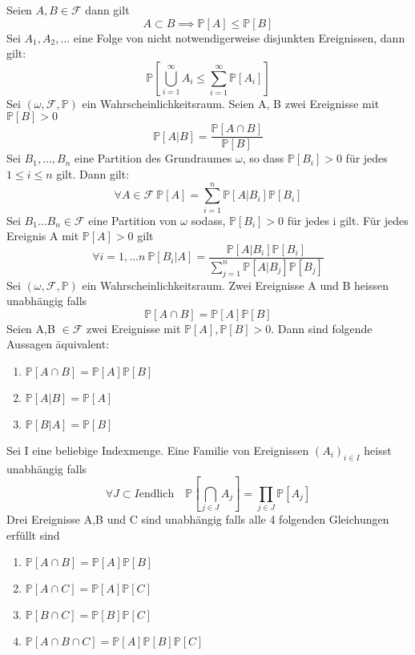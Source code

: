 \Satz[1.8] Seien \(A,B \in \mathcal{F}\) dann gilt \[ A \subset B \implies \mathbb{P}[A] \leq \mathbb{P}[B]\]
\Satz[1.9] Sei \( A_1, A_2, \dots \) eine Folge von nicht notwendigerweise disjunkten Ereignissen, dann gilt: \[ \mathbb{P}[\bigcup_{i=1}^{\infty} A_i \leq \sum_{i=1}^{\infty} \mathbb{P}[A_i]]\]
 \newline
Sei \((\omega, \mathcal{F}, \mathbb{P})\) ein Wahrscheinlichkeitsraum. Seien A, B zwei Ereignisse mit \( \mathbb{P}[B] > 0\) \[\mathbb{P}[A|B] = \frac{\mathbb{P}\left[A \cap B\right]}{\mathbb{P}\left[B\right]}\]
 \newline
Sei  \( B_1, \dots , B_n\) eine Partition des Grundraumes \( \omega \), so dass \( \mathbb{P}[B_i] > 0 \) für jedes \( 1 \leq i \leq n\) gilt. Dann gilt: \[\forall A \in  \mathcal{F} \ \mathbb{P}[A] = \sum_{i=1}^{n} \mathbb{P} \left[A | B_i \right] \mathbb{P}[B_i]\]
 \newline
Sei \( B_1 \dots B_n \in \mathcal{F }\) eine Partition von \( \omega\) sodass, \( \mathbb{P}[B_i] > 0 \) für jedes i gilt. Für jedes Ereignis A mit \( \mathbb{P}[A] > 0 \) gilt  \[ \forall i = 1, \dots n \ \mathbb{P}\left[ B_i | A \right] = \frac{\mathbb{P}[A | B_i] \mathbb{P}[B_i]}{\sum_{j=1}^{n} \mathbb{P}[A | B_j] \mathbb{P}[B_j] }\]
\Def[1.18 Unabhängigkeit] \newline
Sei \( (\omega, \mathcal{F}, \mathbb{P})\) ein Wahrscheinlichkeitsraum. Zwei Ereignisse A und B heissen unabhängig falls \[ \mathbb{P} \left[A \cap B \right] = \mathbb{P}\left[A\right] \mathbb{P} \left[B\right]\]
\Satz[1.20] \newline
Seien A,B \( \in \mathcal{F}\) zwei Ereignisse mit \( \mathbb{P}[A], \mathbb{P}[B] > 0 \). Dann sind folgende Aussagen äquivalent:
\begin{enumerate}
    \item \( \mathbb{P}[A \cap B] = \mathbb{P}[A] \mathbb{P}[B]\)
    \item \( \mathbb{P}[A | B] = \mathbb{P}[A]\)
    \item \( \mathbb{P}[B | A] = \mathbb{P}[B]\)
\end{enumerate}
\Def[1.21]  \newline
Sei I eine beliebige Indexmenge. Eine Familie von Ereignissen \( (A_i)_{i \in I}\) heisst unabhängig falls \[ \forall J \subset I \text{endlich} \quad \mathbb{P}[\bigcap_{j \in J}A_j] = \prod_{j \in J} \mathbb{P}[A_j]\]
\Bem \newline
Drei Ereignisse A,B und C sind unabhängig falls alle 4 folgenden Gleichungen erfüllt sind
\begin{enumerate}
    \item \( \mathbb{P}[A \cap B ] = \mathbb{P}[A] \mathbb{P}[B]\)
    \item \( \mathbb{P}[A \cap C ] = \mathbb{P}[A] \mathbb{P}[C]\)
    \item \( \mathbb{P}[B \cap C ] = \mathbb{P}[B] \mathbb{P}[C]\)
    \item \( \mathbb{P}[A \cap B \cap C  ] = \mathbb{P}[A] \mathbb{P}[B] \mathbb{P}[C]\)
\end{enumerate}